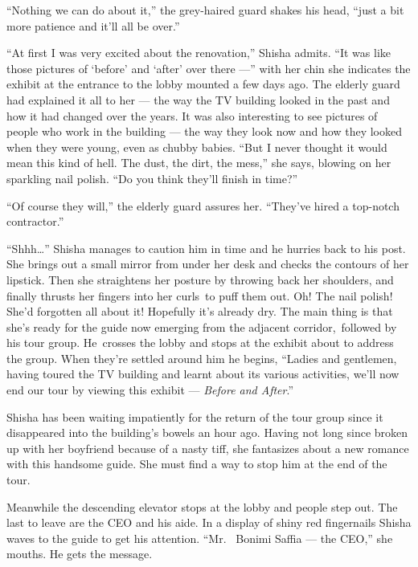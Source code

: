 \documentclass[twoside,11pt,openany]{book}
\begin{document}
``Nothing we can do about it,'' the grey-haired guard shakes his head, ``just a
bit more patience and it'll all be over.''

``At first I was very excited about the renovation,'' Shisha admits. ``It was
like those pictures of `before' and `after' over there ---'' with her chin she indicates the exhibit at the
entrance to the lobby mounted a few days ago. The elderly guard had explained it all to her --- the way the TV building
looked in the past and how it had changed over the years. It was also interesting to see pictures of people who work in
the building --- the way they look now and how they looked when they were young, even as chubby babies.
``But I never thought it would mean this kind of hell. The dust, the dirt, the mess,'' she
says, blowing on her sparkling nail polish. ``Do you think they'll finish in time?''

``Of course they will,'' the elderly guard assures her. ``They've hired a
top-notch contractor.''

``Shhh{\ldots}'' Shisha manages to caution him in time and he hurries back to his post. She
brings out a small mirror from under her desk and checks the contours of her lipstick. Then she straightens her posture
by{ }throwing back her shoulders, and finally thrusts her fingers into her curls~to puff them out. Oh!
The nail polish! She'd forgotten all about it! Hopefully it's already dry. The main thing is that she's ready for the
guide now emerging from the adjacent corridor,~followed by his tour group. He~crosses the lobby and stops at the
exhibit about to address the group. When they're settled around him he begins, ``Ladies and gentlemen,
having toured the TV building and learnt about its various activities, we'll now end our tour by viewing this exhibit --- \textit{Before and After}.''

Shisha has been waiting impatiently for the return of the tour group since it disappeared into the building's bowels an
hour ago. Having not long since broken up with her boyfriend because of a nasty tiff, she fantasizes about a new
romance with this handsome guide. She must find a way to stop him at the end of the tour.

Meanwhile the descending elevator stops at the lobby and people step out. The last to leave are the CEO and his aide. In
a display of shiny red fingernails Shisha waves to the guide to get his attention. ``Mr. ~Bonimi Saffia ---
the CEO,'' she mouths. He gets the message.
\end{document}
